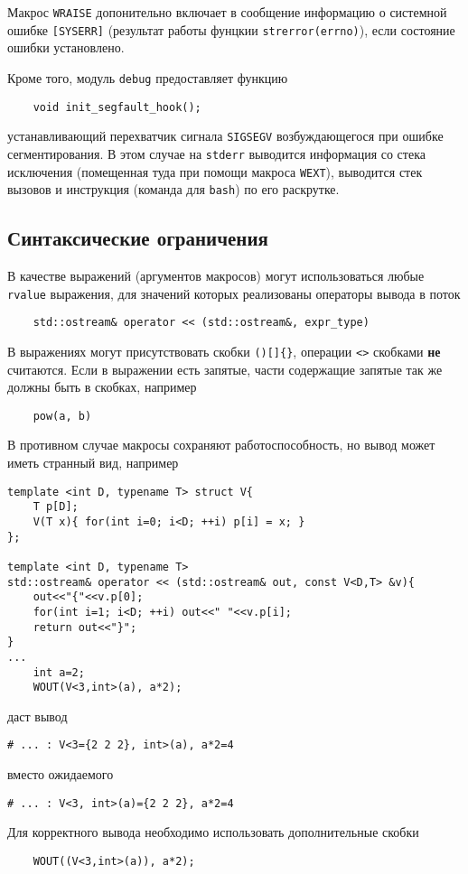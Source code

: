Макрос \verb'WRAISE' допонительно включает в сообщение информацию о системной ошибке \verb'[SYSERR]' (результат работы
фунцкии \verb'strerror(errno)'), если состояние ошибки установлено.

Кроме того, модуль \verb'debug' предоставляет функцию
\begin{verbatim}
    void init_segfault_hook();
\end{verbatim}
устанавливающий перехватчик сигнала \verb'SIGSEGV' возбуждающегося при ошибке сегментирования. В этом случае на \verb'stderr' выводится информация со стека исключения
(помещенная туда при помощи макроса \verb'WEXT'), выводится стек вызовов и инструкция (команда для \verb'bash') по его раскрутке. 

\subsection{Синтаксические ограничения}
В качестве выражений (аргументов макросов) могут использоваться любые \verb'rvalue' выражения,
для значений которых реализованы операторы
вывода в поток
\begin{verbatim}
    std::ostream& operator << (std::ostream&, expr_type)
\end{verbatim}

В выражениях могут присутствовать скобки \verb'()[]{}', операции \verb'<>' скобками {\bf не} считаются.
Если в выражении есть запятые, части содержащие запятые так же должны быть в скобках, например
\begin{verbatim}
    pow(a, b)   
\end{verbatim}
В противном случае макросы сохраняют работоспособность, но вывод может иметь странный вид, например
\begin{verbatim}
template <int D, typename T> struct V{
    T p[D];
    V(T x){ for(int i=0; i<D; ++i) p[i] = x; }
};

template <int D, typename T> 
std::ostream& operator << (std::ostream& out, const V<D,T> &v){
    out<<"{"<<v.p[0];
    for(int i=1; i<D; ++i) out<<" "<<v.p[i];
    return out<<"}";
}
...
    int a=2;
    WOUT(V<3,int>(a), a*2);
\end{verbatim}
даст вывод
\begin{verbatim}
# ... : V<3={2 2 2}, int>(a), a*2=4
\end{verbatim}
вместо ожидаемого
\begin{verbatim}
# ... : V<3, int>(a)={2 2 2}, a*2=4
\end{verbatim}
Для корректного вывода необходимо использовать дополнительные скобки
\begin{verbatim}
    WOUT((V<3,int>(a)), a*2);
\end{verbatim}

